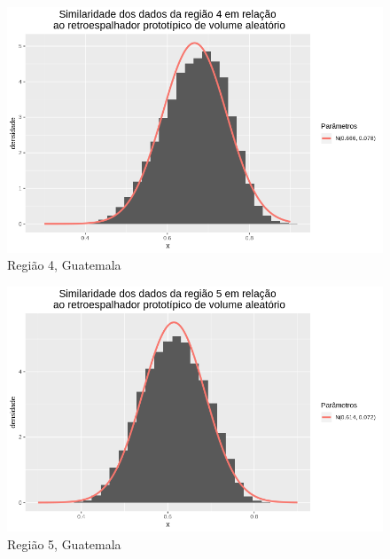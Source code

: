 \documentclass[12pt]{article}
\begin{document}
\begin{figure}[!h]
    \centering    
    \vspace{0.1\linewidth}
    \includegraphics[width = 0.95\linewidth]{../../Images/Report_18_12_17/rv_region4.png}
    \caption{Região 4, Guatemala}
    \label{fig:rv_r4}
\end{figure}

\begin{figure}[!h]
    \centering    
    \vspace{0.1\linewidth}
    \includegraphics[width = 0.95\linewidth]{../../Images/Report_18_12_17/rv_region5.png}
    \caption{Região 5, Guatemala}
    \label{fig:rv_r5}
\end{figure}
\end{document}
